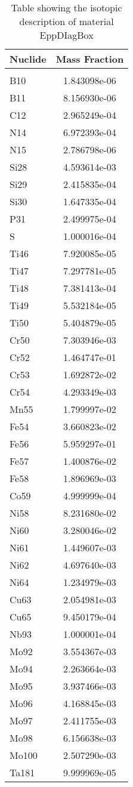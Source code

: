 \begin{centering}
\begin{table}[ht!]
\begin{tabular}{l | c}
\hline
Nuclide & Mass Fraction\\
\hline
\\
B10 & 1.843098e-06\\
B11 & 8.156930e-06\\
C12 & 2.965249e-04\\
N14 & 6.972393e-04\\
N15 & 2.786798e-06\\
Si28 & 4.593614e-03\\
Si29 & 2.415835e-04\\
Si30 & 1.647335e-04\\
P31 & 2.499975e-04\\
S & 1.000016e-04\\
Ti46 & 7.920085e-05\\
Ti47 & 7.297781e-05\\
Ti48 & 7.381413e-04\\
Ti49 & 5.532184e-05\\
Ti50 & 5.404879e-05\\
Cr50 & 7.303946e-03\\
Cr52 & 1.464747e-01\\
Cr53 & 1.692872e-02\\
Cr54 & 4.293349e-03\\
Mn55 & 1.799997e-02\\
Fe54 & 3.660823e-02\\
Fe56 & 5.959297e-01\\
Fe57 & 1.400876e-02\\
Fe58 & 1.896969e-03\\
Co59 & 4.999999e-04\\
Ni58 & 8.231680e-02\\
Ni60 & 3.280046e-02\\
Ni61 & 1.449607e-03\\
Ni62 & 4.697640e-03\\
Ni64 & 1.234979e-03\\
Cu63 & 2.054981e-03\\
Cu65 & 9.450179e-04\\
Nb93 & 1.000001e-04\\
Mo92 & 3.554367e-03\\
Mo94 & 2.263664e-03\\
Mo95 & 3.937466e-03\\
Mo96 & 4.168845e-03\\
Mo97 & 2.411755e-03\\
Mo98 & 6.156638e-03\\
Mo100 & 2.507290e-03\\
Ta181 & 9.999969e-05
\end{tabular}
\caption{Table showing the isotopic description of material EppDIagBox}
\label{table:material_EppDIagBox}
\end{table}\clearpage


\end{centering}
